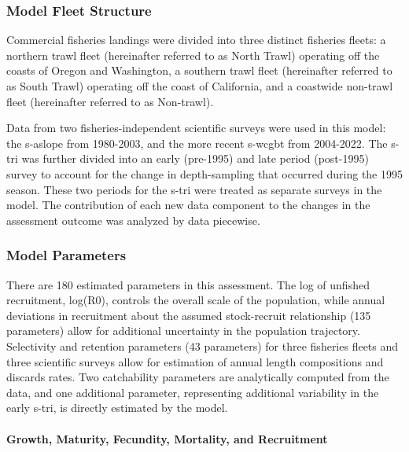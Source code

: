 \documentclass[11pt,
  english,
  letterpaper,
]{article}
\begin{document}
\hypertarget{model-fleet-structure}{%
\subsubsection{Model Fleet Structure}\label{model-fleet-structure}}

Commercial fisheries landings were divided into three distinct fisheries fleets: a northern trawl fleet (hereinafter referred to as North Trawl) operating off the coasts of Oregon and Washington, a southern trawl fleet (hereinafter referred to as South Trawl) operating off the coast of California, and a coastwide non-trawl fleet (hereinafter referred to as Non-trawl).

Data from two fisheries-independent scientific surveys were used in this model: the \gls{s-aslope} from 1980-2003, and the more recent \gls{s-wcgbt} from 2004-2022. The \gls{s-tri} was further divided into an early (pre-1995) and late period (post-1995) survey to account for the change in depth-sampling that occurred during the 1995 season. These two periods for the \gls{s-tri} were treated as separate surveys in the model. The contribution of each new data component to the changes in the assessment outcome was analyzed by data piecewise.

\hypertarget{model-parameters}{%
\subsubsection{Model Parameters}\label{model-parameters}}

There are 180 estimated parameters in this assessment. The log of unfished recruitment, log(R0), controls the overall scale of the population, while annual deviations in recruitment about the assumed stock-recruit relationship (135 parameters) allow for additional uncertainty in the population trajectory. Selectivity and retention parameters (43 parameters) for three fisheries fleets and three scientific surveys allow for estimation of annual length compositions and discards rates. Two catchability parameters are analytically computed from the data, and one additional parameter, representing additional variability in the early \gls{s-tri}, is directly estimated by the model.

\hypertarget{growth-maturity-fecundity-mortality-and-recruitment}{%
\paragraph{Growth, Maturity, Fecundity, Mortality, and Recruitment}\label{growth-maturity-fecundity-mortality-and-recruitment}}
\end{document}
